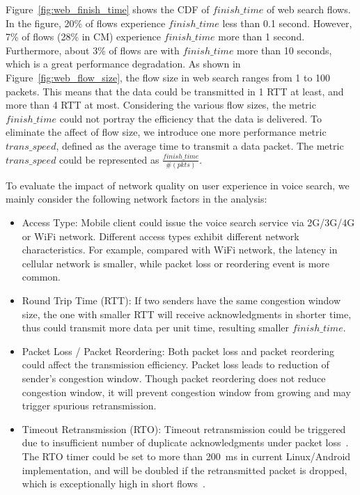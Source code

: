 Figure~\ref{fig:web_finish_time} shows the CDF of $finish\_time$ of web search flows. In the figure, 20\% of flows experience $finish\_time$ less than 0.1 second. However, 7\% of flows (28\% in CM) experience $finish\_time$ more than 1 second. Furthermore, about 3\% of flows are with $finish\_time$ more than 10 seconds, which is a great performance degradation. As shown in Figure~\ref{fig:web_flow_size}, the flow size in web search ranges from 1 to 100 packets. This means that the data could be transmitted in 1 RTT at least, and more than 4 RTT at most. Considering the various flow sizes, the metric $finish\_time$ could not portray the efficiency that the data is delivered. To eliminate the affect of flow size, we introduce one more performance metric $trans\_speed$, defined as the average time to transmit a data packet. The metric $trans\_speed$ could be represented as $\frac{finish\_time}{\#(pkts)}$.

To evaluate the impact of network quality on user experience in voice search, we mainly consider the following network factors in the analysis:

\begin{itemize}
\setlength{\itemsep}{-8pt}
\setlength{\topsep}{-8pt}
	\item {Access Type: } Mobile client could issue the voice search service via 2G/3G/4G or WiFi network. Different access types exhibit different network characteristics. For example, compared with WiFi network, the latency in cellular network is smaller, while packet loss or reordering event is more common. \\
	\item {Round Trip Time (RTT): } If two senders have the same congestion window size, the one with smaller RTT will receive acknowledgments in shorter time, thus could transmit more data per unit time, resulting smaller $finish\_time$. \\
	\item {Packet Loss / Packet Reordering: } Both packet loss and packet reordering could affect the transmission efficiency. Packet loss leads to reduction of sender's congestion window. Though packet reordering does not reduce congestion window, it will prevent congestion window from growing and may trigger spurious retransmission. \\
	\item {Timeout Retransmission (RTO): } Timeout retransmission could be triggered due to insufficient number of duplicate acknowledgments under packet loss~\cite{rfc6675}. The RTO timer could be set to more than 200~ms in current Linux/Android implementation, and will be doubled if the retransmitted packet is dropped, which is exceptionally high in short flows~\cite{flach2013reducing}.\\
\end{itemize}

